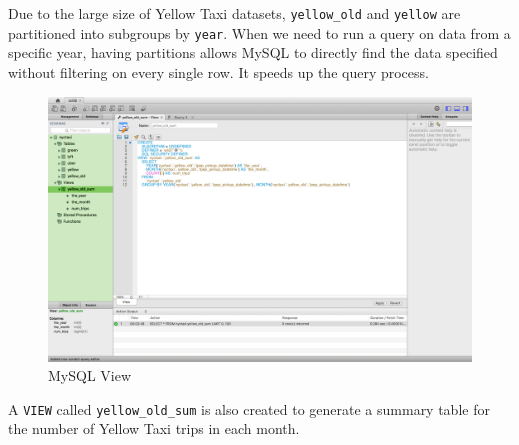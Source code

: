 \documentclass[12pt,twoside]{reedthesis}
\theoremstyle{definition}
\theoremstyle{definition}
\theoremstyle{definition}
\theoremstyle{remark}
\begin{document}
Due to the large size of Yellow Taxi datasets, \texttt{yellow\_old} and
\texttt{yellow} are partitioned into subgroups by \texttt{year}. When we
need to run a query on data from a specific year, having partitions
allows MySQL to directly find the data specified without filtering on
every single row. It speeds up the query process.
\begin{figure}

{\centering \includegraphics[width=5.76in]{figure/mysql_view} 

}

\caption{MySQL View}\label{fig:mysql-view}
\end{figure}
A \texttt{VIEW} called \texttt{yellow\_old\_sum} is also created to
generate a summary table for the number of Yellow Taxi trips in each
month.
\end{document}
